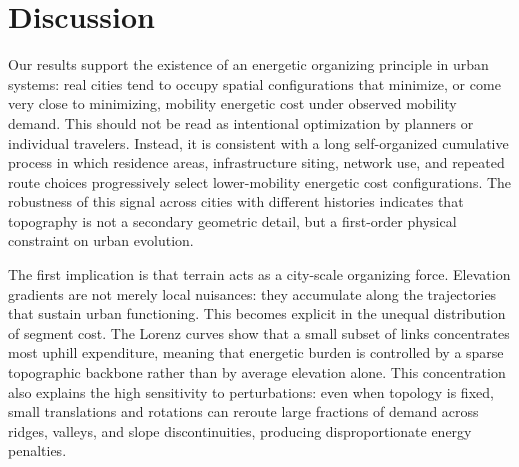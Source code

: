 \documentclass[twocolumn,amsmath,amssymb,floatfix,nature,shownopacs,footinbib,superscriptaddress]{revtex4-2}
\begin{document}
\section*{Discussion}

Our results support the existence of an energetic organizing principle in urban systems: real cities tend to occupy spatial configurations that minimize, or come very close to minimizing, mobility energetic cost under observed mobility demand. This should not be read as intentional optimization by planners or individual travelers. Instead, it is consistent with a long self-organized cumulative process in which residence areas, infrastructure siting, network use, and repeated route choices progressively select lower-mobility energetic cost configurations. The robustness of this signal across cities with different histories indicates that topography is not a secondary geometric detail, but a first-order physical constraint on urban evolution. 


The first implication is that terrain acts as a city-scale organizing force. Elevation gradients are not merely local nuisances: they accumulate along the trajectories that sustain urban functioning. This becomes explicit in the unequal distribution of segment cost. The Lorenz curves show that a small subset of links concentrates most uphill expenditure, meaning that energetic burden is controlled by a sparse topographic backbone rather than by average elevation alone. This concentration also explains the high sensitivity to perturbations: even when topology is fixed, small translations and rotations can reroute large fractions of demand across ridges, valleys, and slope discontinuities, producing disproportionate energy penalties. 

\end{document}
